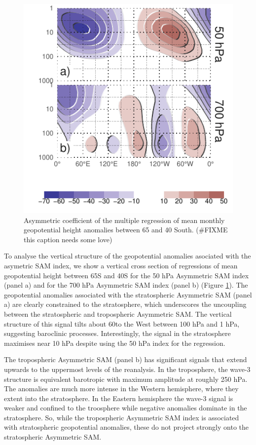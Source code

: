 \documentclass[twocol]{ametsocV5}
\begin{document}
\begin{figure}
\includegraphics{vertical-regression-1} \caption[Asymmetric coefficient of the multiple regression of mean monthly geopotential height anomalies between 65 and 40 South]{Asymmetric coefficient of the multiple regression of mean monthly geopotential height anomalies between 65 and 40 South. (\#FIXME this caption needs some love)}\label{fig:vertical-regression}
\end{figure}

To analyse the vertical structure of the geopotential anomalies
asociated with the asymetric SAM index, we show a vertical cross section
of regressions of mean geopotential height between 65\degree S and
40\degree S for the 50 hPa Asymmetric SAM index (panel a) and for the
700 hPa Asymmetric SAM index (panel b) (Figure
\ref{fig:vertical-regression}). The geopotential anomalies associated
with the stratospheric Asymmetric SAM (panel a) are clearly constrained
to the stratosphere, which underscores the uncoupling between the
stratospheric and tropospheric Asymmetric SAM. The vertical structure of
this signal tilts about 60\degree to the West between 100 hPa and 1 hPa,
suggesting baroclinic processes. Interestingly, the signal in the
stratosphere maximises near 10 hPa despite using the 50 hPa index for
the regression.

The tropospheric Asymmetric SAM (panel b) has significant signals that
extend upwards to the uppermost levels of the reanalysis. In the
troposphere, the wave-3 structure is equivalent barotropic with maximum
amplitude at roughly 250 hPa. The anomalies are much more intense in the
Western hemisphere, where they extent into the stratosphere. In the
Eastern hemisphere the wave-3 signal is weaker and confined to the
troosphere while negative anomalies dominate in the stratosphere. So,
while the tropospheric Asymmetric SAM index is associated with
stratospheric geopotential anomalies, these do not project strongly onto
the stratospheric Asymmetric SAM.
\end{document}
